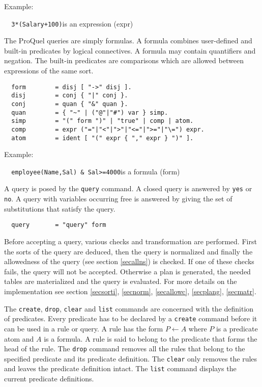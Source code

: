 Example:

\verb/  3*(Salary+100)/\quad is an expression (expr)

The ProQuel queries are simply formulas. A formula combines user-defined and built-in predicates
by logical connectives. A formula may contain quantifiers and negation. The built-in predicates
are comparisons which are allowed between expressions of the same sort.

\begin{verbatim}
  form        = disj [ "->" disj ].
  disj        = conj { "|" conj }.
  conj        = quan { "&" quan }.
  quan        = { "~" | ("@"|"#") var } simp.
  simp        = "(" form ")" | "true" | comp | atom.
  comp        = expr ("="|"<"|">"|"<="|">="|"\=") expr.
  atom        = ident [ "(" expr { "," expr } ")" ].
\end{verbatim}

Example:

\verb/  employee(Name,Sal) & Sal>=4000/\quad is a formula (form)

A query is posed by the \verb.query. command. A closed query is answered by \verb.yes. or 
\verb.no.. A query with variables occurring free is answered by giving the set of substitutions
that satisfy the query.

\begin{verbatim}
  query       = "query" form
\end{verbatim}

Before accepting a query, various checks and transformation are performed. First the sorts of
the query are deduced, then the query is normalized and finally the allowedness of the query
(see section \ref{secallns}) is checked. If one of these checks fails, the query will not be 
accepted. Otherwise a plan is generated, the needed tables are materialized and the query is 
evaluated. For more details on the implementation see section \ref{secsorti}, \ref{secnorm}, 
\ref{secallowc}, \ref{secplang}, \ref{secmatr}.

\label{secpreddef}
The \verb.create., \verb.drop., \verb.clear. and \verb.list. commands are concerned with the 
definition of predicates. Every predicate has to be declared by a \verb.create. command before 
it can be used in a rule or query. A rule has the form $P \leftarrow A$ where $P$ is a predicate 
atom and $A$ is a formula. A rule is said to belong to the predicate that forms the head of the 
rule. The \verb.drop. command removes all the rules that belong to the specified predicate and its
predicate definition. The \verb.clear. only removes the rules and leaves the predicate definition
intact. The \verb.list. command displays the current predicate definitions.

